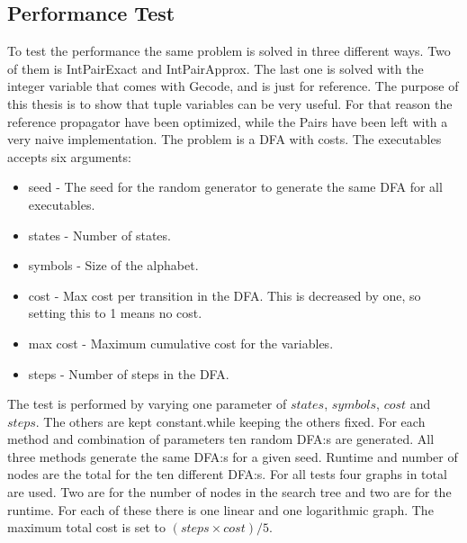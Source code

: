 \documentclass[a4paper,11pt]{article}
\begin{document}
\subsection{Performance Test}
To test the performance the same problem is solved in three different ways. Two of them is IntPairExact and IntPairApprox. The last one is solved with the integer variable that comes with Gecode, and is just for reference. The purpose of this thesis is to show that tuple variables can be very useful. For that reason the reference propagator have been optimized, while the Pairs have been left with a very naive implementation. The problem is a DFA with costs. The executables accepts six arguments: 
\begin{itemize}
\item{seed} - The seed for the random generator to generate the same DFA for all executables.
\item{states} - Number of states.
\item{symbols} - Size of the alphabet.
\item{cost} - Max cost per transition in the DFA. This is decreased by one, so setting this to 1 means no cost.
\item{max cost} - Maximum cumulative cost for the variables.
\item{steps} - Number of steps in the DFA.
\end{itemize}
The test is performed by varying one parameter of $states$, $symbols$, $cost$ and $steps$. The others are kept constant.while keeping the others fixed. For each method and combination of parameters ten random DFA:s are generated. All three methods generate the same DFA:s for a given seed. Runtime and number of nodes are the total for the ten different DFA:s. For all tests four graphs in total are used. Two are for the number of nodes in the search tree and two are for the runtime. For each of these there is one linear and one logarithmic graph. The maximum total cost is set to $(steps\times cost)/5$.






%
\end{document}
